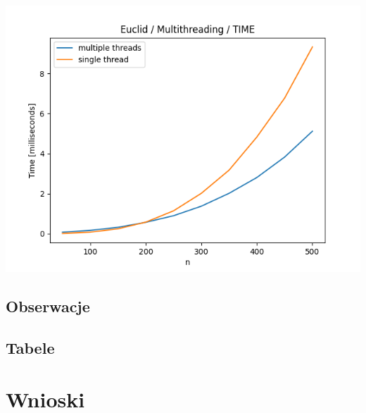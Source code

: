 \documentclass{article}
\begin{document}
\begin{center}
\includegraphics[width=\textwidth, 
                   height = 0.4\textheight, 
                   keepaspectratio]
                  {plots/multithreading_euclid_time} 
\end{center}

\subsection{Obserwacje}

\subsection{Tabele}



\section{Wnioski}
\end{document}
